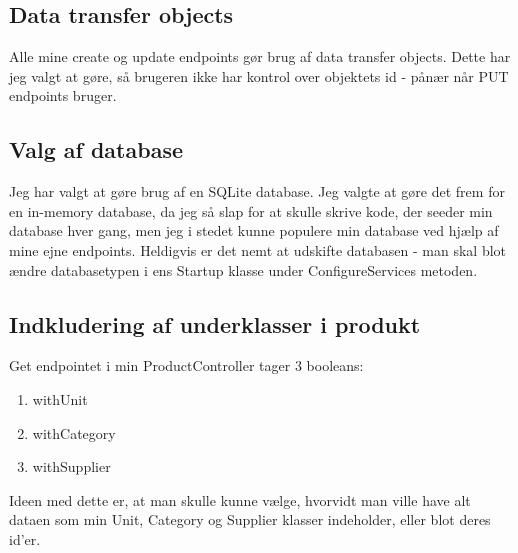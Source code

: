 \documentclass[a4paper]{article}
\begin{document}
\subsection*{Data transfer objects}
Alle mine create og update endpoints gør brug af data transfer objects.
Dette har jeg valgt at gøre, så brugeren ikke har kontrol over objektets id - pånær når PUT endpoints bruger.

\subsection*{Valg af database}
Jeg har valgt at gøre brug af en SQLite database.
Jeg valgte at gøre det frem for en in-memory database, da jeg så slap for at skulle skrive kode, der seeder min database hver gang, men jeg i stedet kunne populere min database ved hjælp af mine ejne endpoints.
Heldigvis er det nemt at udskifte databasen - man skal blot ændre databasetypen i ens Startup klasse under ConfigureServices metoden.

\subsection*{Indkludering af underklasser i produkt}
Get endpointet i min ProductController tager 3 booleans:
\begin{enumerate}
    \item withUnit
    \item withCategory
    \item withSupplier
\end{enumerate}

Ideen med dette er, at man skulle kunne vælge, hvorvidt man ville have alt dataen som min Unit, Category og Supplier klasser indeholder, eller blot deres id'er.
\end{document}
